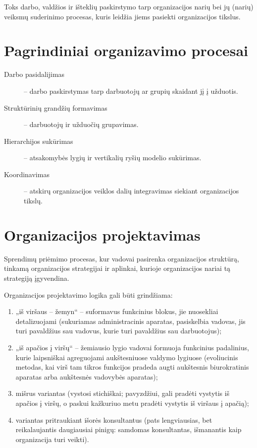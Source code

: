 \begin{defn}[Organizavimas]
  Toks darbo, valdžios ir išteklių paskirstymo tarp organizacijos
  narių bei jų (narių) veiksmų suderinimo procesas, kuris leidžia jiems
  pasiekti organizacijos tikslus.
\end{defn}

\section{Pagrindiniai organizavimo procesai}

\begin{description}
  \item[Darbo pasidalijimas] – darbo paskirstymas tarp darbuotojų ar
    grupių skaidant jį į užduotis.
  \item[Struktūrinių grandžių formavimas] – darbuotojų ir
    užduočių grupavimas.
  \item[Hierarchijos sukūrimas] – atsakomybės lygių ir vertikalių
    ryšių modelio sukūrimas.
  \item[Koordinavimas] – atskirų organizacijos veiklos dalių integravimas
    siekiant organizacijos tikslų.
\end{description}

\section{Organizacijos projektavimas}

\begin{defn}
  Sprendimų priėmimo procesas, kur vadovai pasirenka organizacijos
  struktūrą, tinkamą organizacijos strategijai ir aplinkai, kurioje
  organizacijos nariai tą strategiją įgyvendina.
\end{defn}

Organizacijos projektavimo logika gali būti grindžiama:
\begin{enumerate}
  \item „iš viršaus – žemyn“ – suformavus funkcinius blokus, jie
    nuosekliai detalizuojami (sukuriamas administracinis aparatas,
    pasiskelbia vadovas, jis turi pavaldžius sau vadovus, kurie
    turi pavaldžius sau darbuotojus);
  \item „iš apačios į viršų“ – žemiausio lygio vadovai formuoja
    funkcinius padalinius, kurie laipsniškai agreguojami aukštesniuose
    valdymo lygiuose (evoliucinis metodas, kai virš tam tikros funkcijos
    pradeda augti aukštesnis biurokratinis aparatas arba aukštesnės
    vadovybės aparatas);
  \item mišrus variantas (vystosi stichiškai; pavyzdžiui, gali pradėti
    vystytis iš apačios į viršų, o paskui kažkuriuo metu pradėti vystytis
    iš viršaus į apačią);
  \item variantas pritraukiant išorės konsultantus (pats lengviausias,
    bet reikalaujantis daugiausiai pinigų: samdomas konsultantas, 
    išmanantis kaip organizacija turi veikti).
\end{enumerate}

